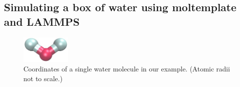 \documentclass[11pt]{article}
\begin{document}


\subsection{Simulating a box of water using moltemplate and LAMMPS}
\label{sec:spce_example}

\begin{figure}[htbp]
\centering
\includegraphics[width=2.4cm]{single_water_LR.jpg}
\caption{
\label{fig:single_water}
Coordinates of a single water molecule in our example.
(Atomic radii not to scale.)
}
\end{figure}
\end{document}
